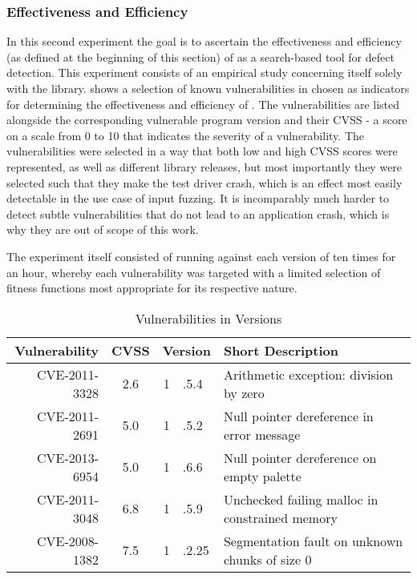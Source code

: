 \subsubsection{Effectiveness and Efficiency}
In this second experiment the goal is to ascertain the effectiveness and efficiency (as defined at the
beginning of this section) of \xmlmate as a search-based tool for defect detection. This experiment consists of
an empirical study concerning itself solely with the \libpng library.  shows a selection of known vulnerabilities in \libpng
chosen as indicators for determining the effectiveness and efficiency of \xmlmate. The vulnerabilities are
listed alongside the corresponding vulnerable program version and their CVSS - a score on a scale from 0 to 10
that indicates the severity of a vulnerability.
The vulnerabilities were selected in a way that both low and high CVSS scores were represented, as well as
different library releases, but most importantly they were selected such that they make the test driver crash,
which is an effect most easily detectable in the use case of input fuzzing. It is incomparably much harder to
detect subtle vulnerabilities that do not lead to an application crash, which is why they are out of scope of
this work.

The experiment itself consisted of running \xmlmate against each version of \libpng ten times for an hour,
whereby each vulnerability was targeted with a limited selection of fitness functions most appropriate for
its respective nature.

\begin{table}[H]
\centering
\begin{tabular}{|r|c|r@{}l|l|}
\hline
Vulnerability & CVSS  & \multicolumn{2}{c|}{Version} & Short Description \\ \hline \hline 
CVE-2011-3328 & 2.6   & 1&.5.4 	& Arithmetic exception: division by zero   \\ \hline  %
CVE-2011-2691 & 5.0   & 1&.5.2	& Null pointer dereference in error message \\ \hline %
CVE-2013-6954 & 5.0   & 1&.6.6  & Null pointer dereference on empty palette \\ \hline %
CVE-2011-3048 & 6.8   & 1&.5.9  & Unchecked failing malloc in constrained memory \\ \hline %
CVE-2008-1382 & 7.5   & 1&.2.25 & Segmentation fault on unknown chunks of size 0\\ \hline %
\end{tabular}
\caption{Vulnerabilities in \libpng Versions}
\label{tbl:png:vulns}
\end{table}

